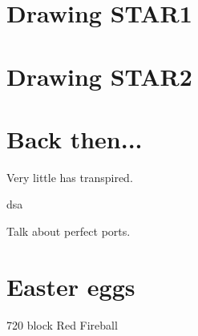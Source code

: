 \section{Drawing STAR1}
\section{Drawing STAR2}

\section{Back then...}
Very little has transpired.
\pagebreak

dsa

\pagebreak

Talk about perfect ports.


\section{Easter eggs}
720 block
Red Fireball